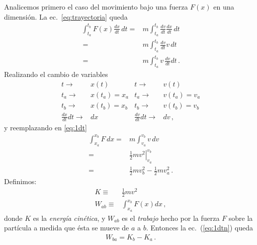 Analicemos primero el caso del movimiento bajo una fuerza $F(x)$ en una dimensión. La ec.~\eqref{eq:trayectoria} queda
\begin{align}
  \label{eq:1dt}
 \int_{t_a}^{t_b}F(x)\frac{dx}{dt}\,dt=&m\int_{t_a}^{t_b}\frac{dv}{dt}\frac{dx}{dt}\,dt\nonumber\\\, 
 =&m\int_{t_a}^{t_b}\frac{dv}{dt}v\,dt\nonumber\\\, 
 =&m\int_{t_a}^{t_b}v\,\frac{dv}{dt}dt\,.
\end{align}
Realizando el cambio de variables
\begin{align}
  t\to&x(t) & t\to&v(t)\nonumber\\
 t_a\to& x(t_a)=x_a& t_a\to& v(t_a)=v_a\nonumber\\
 t_b\to& x(t_b)=x_b& t_b\to& v(t_b)=v_b\nonumber\\
 \frac{dx}{dt}dt\to& dx& \frac{dv}{dt}dt\to&dv\,,
\end{align}
y reemplazando en \eqref{eq:1dt}
\begin{align}
  \label{eq:1dtn}
 \int_{x_a}^{x_b}F\,{dx}=&m\int_{v_a}^{v_b}v\,{dv}\nonumber\\
 =&\left.\frac{1}{2}mv^2\right|_{v_a}^{v_b}\nonumber\\
=&\tfrac{1}{2}mv_b^2-\tfrac{1}{2}mv_a^2\,.
\end{align}
Definimos:
\begin{align}
  \label{eq:K}
  K\equiv&\frac{1}{2}m v^2\nonumber\\
  W_{a b}\equiv&\int_{x_a}^{x_b}F(x)dx\,,
\end{align}
donde $K$ es la \emph{energía cinética}, y $W_{a b}$ es el \emph{trabajo} hecho por la fuerza $F$ sobre la partícula a medida que ésta se mueve de $a$ a $b$. Entonces la ec.~(\ref{eq:1dtn}) queda
\begin{align}
    W_{ba}=K_b-K_a\,.
\end{align}




